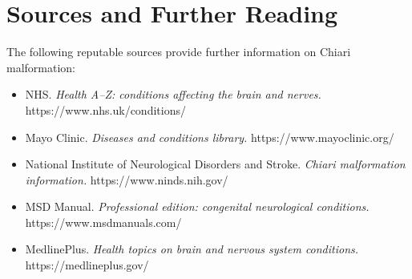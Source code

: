 \section*{Sources and Further Reading}
The following reputable sources provide further information on Chiari malformation:
\begin{itemize}
    \item NHS. \textit{Health A--Z: conditions affecting the brain and nerves.} https://www.nhs.uk/conditions/
    \item Mayo Clinic. \textit{Diseases and conditions library.} https://www.mayoclinic.org/
    \item National Institute of Neurological Disorders and Stroke. \textit{Chiari malformation information.} https://www.ninds.nih.gov/
    \item MSD Manual. \textit{Professional edition: congenital neurological conditions.} https://www.msdmanuals.com/
    \item MedlinePlus. \textit{Health topics on brain and nervous system conditions.} https://medlineplus.gov/
\end{itemize}
